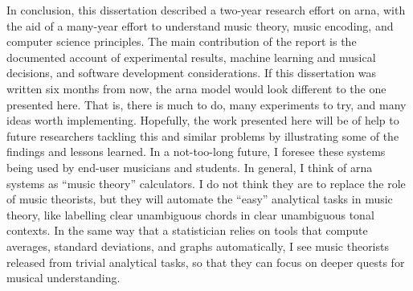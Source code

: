 
In conclusion, this dissertation described a two-year
research effort on \gls{arna}, with the aid of a many-year
effort to understand music theory, music encoding, and
computer science principles. The main contribution of the
report is the documented account of experimental results,
machine learning and musical decisions, and software
development considerations. If this dissertation was written
six months from now, the \gls{arna} model would look
different to the one presented here. That is, there is much
to do, many experiments to try, and many ideas worth
implementing. Hopefully, the work presented here will be of
help to future researchers tackling this and similar
problems by illustrating some of the findings and lessons
learned. In a not-too-long future, I foresee these systems
being used by end-user musicians and students. In general, I
think of \gls{arna} systems as ``music theory'' calculators.
I do not think they are to replace the role of music
theorists, but they will automate the ``easy'' analytical
tasks in music theory, like labelling clear unambiguous
chords in clear unambiguous tonal contexts. In the same way
that a statistician relies on tools that compute averages,
standard deviations, and graphs automatically, I see music
theorists released from trivial analytical tasks, so that
they can focus on deeper quests for musical understanding. 
